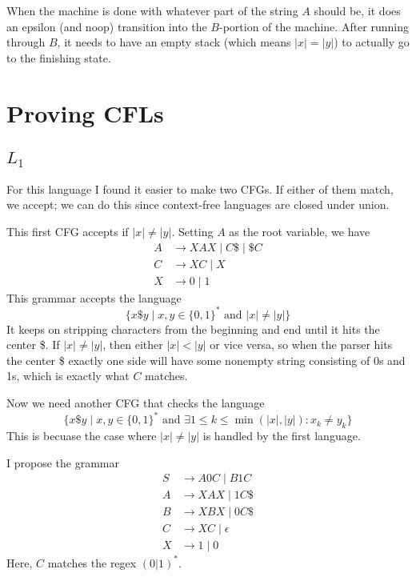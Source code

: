 \documentclass[12pt]{article}
\begin{document}
When the machine is done with whatever part of the string $A$ should be,
it does an epsilon (and noop) transition into the $B$-portion of the machine.
After running through $B$, it needs to have an empty stack (which means $|x|=|y|$)
to actually go to the finishing state.

\pagebreak

\section{Proving CFLs}

\subsection{\texorpdfstring{$L_1$}{L\_1}}

For this language I found it easier to make two CFGs.
If either of them match, we accept; we can do this since context-free languages
are closed under union.

This first CFG accepts if $|x| \ne |y|$.
Setting $A$ as the root variable, we have
\begin{align*}
    A & \to XAX \mid C\$ \mid \$C \\
    C & \to XC \mid X             \\
    X & \to 0 \mid 1
\end{align*}
This grammar accepts the language
\[\{x\$y \mid x, y \in \{0, 1\}^* \text{ and } |x| \ne |y|\}\]
It keeps on stripping characters from the beginning and end until it hits the center \$.
If $|x| \ne |y|$, then either $|x| < |y|$ or vice versa,
so when the parser hits the center \$ exactly one side will have some
nonempty string consisting of 0s and 1s, which is exactly what $C$ matches.

Now we need another CFG that checks the language
\[\{x\$y \mid x, y \in \{0, 1\}^* \text{ and } \exists 1 \le k \le \min(|x|, |y|): x_k \ne y_k\}\]
This is becuase the case where $|x| \ne |y|$ is handled by the first language.

I propose the grammar
\begin{align*}
    S & \to A0C \mid B1C     \\
    A & \to XAX \mid 1C\$    \\
    B & \to XBX \mid 0C\$    \\
    C & \to XC \mid \epsilon \\
    X & \to 1 \mid 0
\end{align*}
Here, $C$ matches the regex $(0|1)^*$.
\end{document}
